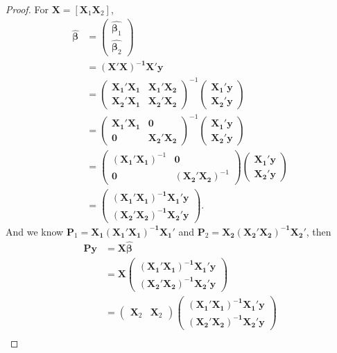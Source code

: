 \documentclass[12pt]{article}
\begin{document}
\begin{proof}
For $\bm{X} = [\bm{X}_1\bm{X}_2]$, 
\begin{align*}
\hat{\bm{\beta}} &= \begin{pmatrix}\hat{\bm{\beta}_1}\\\hat{\bm{\beta}_2}\end{pmatrix}\\
&=\bm{(X'X)^{-1}X'y}\\
&=\begin{pmatrix}\bm{X_1'X_1}&\bm{X_1'X_2}\\
\bm{X_2'X_1}&\bm{X_2'X_2}\end{pmatrix}^{-1}
\begin{pmatrix}\bm{X_1'y}\\\bm{X_2'y}\end{pmatrix}\\
&= \begin{pmatrix}\bm{X_1'X_1}&\bm{0}\\
\bm{0}&\bm{X_2'X_2}\end{pmatrix}^{-1}
\begin{pmatrix}\bm{X_1'y}\\\bm{X_2'y}\end{pmatrix}\\
&=\begin{pmatrix}(\bm{X_1'X_1})^{-1}&\bm{0}\\
\bm{0}&(\bm{X_2'X_2})^{-1}\end{pmatrix}
\begin{pmatrix}\bm{X_1'y}\\\bm{X_2'y}\end{pmatrix}\\
&=\begin{pmatrix}\bm{(X_1'X_1)^{-1}X_1'y}\\\bm{(X_2'X_2)^{-1}X_2'y}\end{pmatrix}.
\end{align*}
And we know $\bm{P}_1 = \bm{X_1(X_1'X_1)^{-1}X_1'}$ and $\bm{P}_2 = \bm{X_2(X_2'X_2)^{-1}X_2'}$, then
\begin{align*}
\bm{Py}&=\bm{X}\hat{\bm{\beta}}\\ &=\bm{X}\begin{pmatrix}\bm{(X_1'X_1)^{-1}X_1'y}\\\bm{(X_2'X_2)^{-1}X_2'y}\end{pmatrix}\\
&=\begin{pmatrix}\bm{X}_2&\bm{X}_2\end{pmatrix}\begin{pmatrix}\bm{(X_1'X_1)^{-1}X_1'y}\\\bm{(X_2'X_2)^{-1}X_2'y}\end{pmatrix}\\

\end{align*}
\end{proof}
\end{document}
